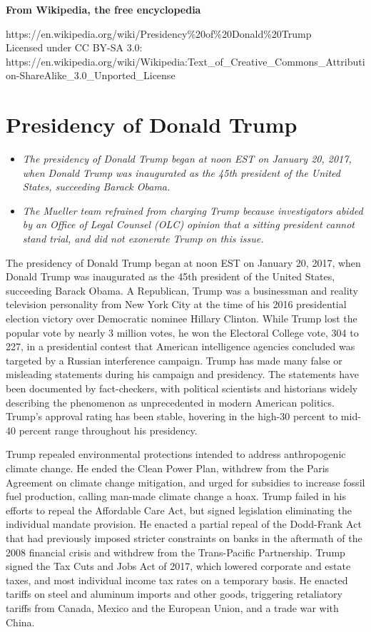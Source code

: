 \textbf{From Wikipedia, the free encyclopedia}

https://en.wikipedia.org/wiki/Presidency\%20of\%20Donald\%20Trump\\
Licensed under CC BY-SA 3.0:\\
https://en.wikipedia.org/wiki/Wikipedia:Text\_of\_Creative\_Commons\_Attribution-ShareAlike\_3.0\_Unported\_License

\section{Presidency of Donald Trump}\label{presidency-of-donald-trump}

\begin{itemize}
\item
  \emph{The presidency of Donald Trump began at noon EST on January 20,
  2017, when Donald Trump was inaugurated as the 45th president of the
  United States, succeeding Barack Obama.}
\item
  \emph{The Mueller team refrained from charging Trump because
  investigators abided by an Office of Legal Counsel (OLC) opinion that
  a sitting president cannot stand trial, and did not exonerate Trump on
  this issue.}
\end{itemize}

The presidency of Donald Trump began at noon EST on January 20, 2017,
when Donald Trump was inaugurated as the 45th president of the United
States, succeeding Barack Obama. A Republican, Trump was a businessman
and reality television personality from New York City at the time of his
2016 presidential election victory over Democratic nominee Hillary
Clinton. While Trump lost the popular vote by nearly 3 million votes, he
won the Electoral College vote, 304 to 227, in a presidential contest
that American intelligence agencies concluded was targeted by a Russian
interference campaign. Trump has made many false or misleading
statements during his campaign and presidency. The statements have been
documented by fact-checkers, with political scientists and historians
widely describing the phenomenon as unprecedented in modern American
politics. Trump's approval rating has been stable, hovering in the
high-30 percent to mid-40 percent range throughout his presidency.

Trump repealed environmental protections intended to address
anthropogenic climate change. He ended the Clean Power Plan, withdrew
from the Paris Agreement on climate change mitigation, and urged for
subsidies to increase fossil fuel production, calling man-made climate
change a hoax. Trump failed in his efforts to repeal the Affordable Care
Act, but signed legislation eliminating the individual mandate
provision. He enacted a partial repeal of the Dodd-Frank Act that had
previously imposed stricter constraints on banks in the aftermath of the
2008 financial crisis and withdrew from the Trans-Pacific Partnership.
Trump signed the Tax Cuts and Jobs Act of 2017, which lowered corporate
and estate taxes, and most individual income tax rates on a temporary
basis. He enacted tariffs on steel and aluminum imports and other goods,
triggering retaliatory tariffs from Canada, Mexico and the European
Union, and a trade war with China.


